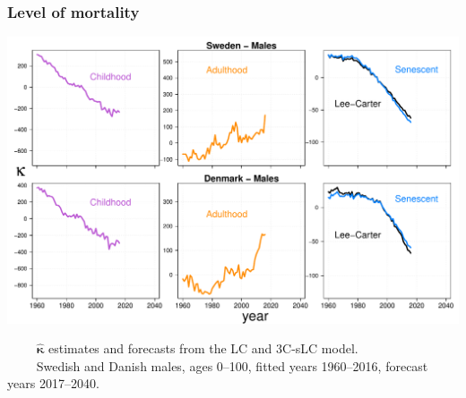 \documentclass[12pt, xcolor=table]{beamer}  %
\begin{document}
\begin{frame}[noframenumbering]           
	\frametitle{Level of mortality}
	
	\vspace{-0.25cm}
	
	\begin{center}
		\includegraphics[scale=0.41]{Figures/Ch5/KappaFore2_M}
	\end{center}

\vspace{-0.3cm}	
\tiny{$\quad\quad$ $\bm{\hat{\kappa}}$ estimates and forecasts from the LC and 3C-sLC model. \\ $\quad\quad$ Swedish and Danish males, ages 0--100, fitted years 1960--2016, forecast years 2017--2040.}
	
\end{frame}
\end{document}
